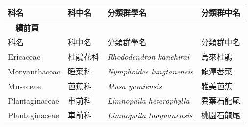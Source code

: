 {\def\arraystretch{1.5}\tabcolsep=2pt
\begin{longtable}{p{3cm}p{2cm}p{5cm}p{3cm}}
    \toprule
      科名 & 科中名 & 分類群學名 & 分類群中名  \\
    \midrule
    \endfirsthead
    {{\bfseries \tablename\ \thetable{} 續前頁 }} \\
    科名 & 科中名 & 分類群學名 & 分類群中名  \\
    \midrule
    \endhead
    Ericaceae & 杜鵑花科 & \textit{Rhododendron kanehirai}  & 烏來杜鵑 \index{Rhododendron@\textit{Rhododendron}!kanehirai@\textit{kanehirai}}  \index{烏來杜鵑} \\
    Menyanthaceae & 睡菜科 & \textit{Nymphoides lungtanensis}  & 龍潭莕菜 \index{Nymphoides@\textit{Nymphoides}!lungtanensis@\textit{lungtanensis}} \index{龍潭莕菜} \\
    Musaceae & 芭蕉科 & \textit{Musa yamiensis}  & 雅美芭蕉 \index{Musa@\textit{Musa}!yamiensis@\textit{yamiensis}} \index{雅美芭蕉} \\
    Plantaginaceae & 車前科 & \textit{Limnophila heterophylla}  & 異葉石龍尾 \index{Limnophila@\textit{Limnophila}!heterophylla@\textit{heterophylla}} \index{異葉石龍尾} \\
    Plantaginaceae & 車前科 & \textit{Limnophila taoyuanensis}  & 桃園石龍尾 \index{Limnophila@\textit{Limnophila}!taoyuanensis@\textit{taoyuanensis}} \index{桃園石龍尾} \\
    \bottomrule
    \end{longtable}
}